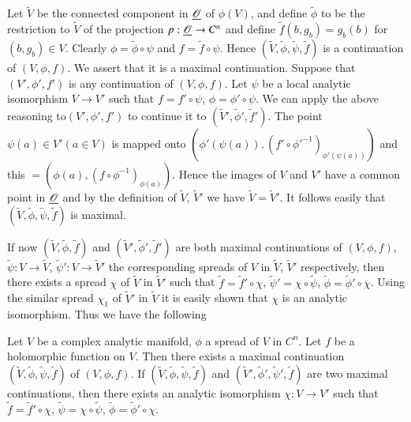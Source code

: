 Let $\tilde{V}$ be the connected component in $\underline{\mathscr{O}}$ of
$\phi(V)$, and define $\tilde{\phi}$ to be the restriction to
$\tilde{V}$ of the projection $p : \underline{\mathscr{O}} \to C^n$ and define
$\tilde{f}(b, g_b)= g_b (b) $ for $(b, g_b) \in V$. Clearly $\phi =
\tilde{\phi} \circ \psi$ and $f =\tilde{f} \circ \psi$. Hence
$(\tilde{V}, \tilde{\phi}, \tilde{\psi}, \tilde{f})$ is a continuation
of $(V, \phi, f)$. We assert that it is a maximal
continuation. Suppose that $(V', \phi', f')$ is any continuation of
$(V, \phi, f)$. Let $\psi$ be a local analytic isomorphism $V \to V'$
such that $f= f' \circ \psi$, $\phi = \phi' \circ \psi$. We can apply
the above reasoning to\pageoriginale $(V', \phi', f')$ to continue it
to $(\tilde{V}', \tilde{\phi}', \tilde{f}')$. The point $\psi(a) \in
V'(a \in V)$ is mapped onto $(\phi' (\psi(a)), (f' \circ
\phi'^{-1})_{\phi' (\psi(a))})$ and this $ = (\phi (a), (f \circ
\phi^{-1})_{\phi (a)})$. Hence the images of $V$ and $V'$ have a
common point in $\underline{\mathscr{O}}$ and by the definition of
$\tilde{V}$, $\tilde{V}'$ we have $\tilde{V} = \tilde{V}'$. It follows
easily that $(\tilde{V}, \tilde{\phi}, \tilde{\psi}, \tilde{f})$ is
maximal.

If now $(\tilde{V}, \tilde{\phi}, \tilde{f})$ and $(\tilde{V}',
\tilde{\phi}' , \tilde{f}')$ are both maximal continuations of
$(V,\phi, f)$, $\tilde{\psi} : V \to \tilde{V}$, $\tilde{\psi}' : V
\to \tilde{V}'$ the corresponding spreads of $V$ in $\tilde{V}$,
$\tilde{V}'$ respectively, then there exists a spread $\chi$ of
$\tilde{V}$ in $\tilde{V}'$ such that $\tilde{f} = \tilde{f}' \circ
\chi$, $\tilde{\psi}' = \chi \circ \tilde{\psi}$, $\tilde{\phi} =
\tilde{\phi}' \circ \chi$. Using the similar spread $\chi_1$ of
$\tilde{V}'$ in $\tilde{V}$ it is easily shown that $\chi$ is an
analytic isomorphism. Thus we have the following

\begin{theorem*}
Let $V$ be a complex analytic manifold, $\phi$ a spread of $V$ in
$C^n$. Let $f$ be a holomorphic function on $V$. Then there exists a
maximal continuation $(\tilde{V}, \tilde{\phi}, \tilde{\psi},
\tilde{f})$ of $(V, \phi, f)$. If $(\tilde{V}, \tilde{\phi},
\tilde{\psi}, \tilde{f})$ and $(\tilde{V}', \tilde{\phi}',
\tilde{\psi}', \tilde{f})$ are two maximal continuations, then there
exists an analytic isomorphism $\chi: V \to V'$ such that $\tilde{f} =
\tilde{f}' \circ \chi$, $\tilde{\psi}= \chi \circ \tilde{\psi}$,
$\tilde{\phi} = \tilde{\phi}' \circ \chi$.
\end{theorem*}
